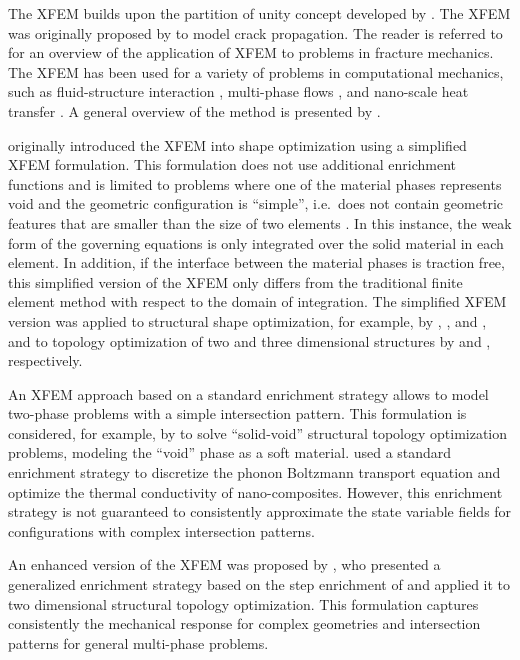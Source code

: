 The XFEM builds upon the partition of unity concept developed by \citet{NME:NME86}. The XFEM was originally proposed by \citet{BB:99} to model crack propagation. The reader is referred to \citet{ANH:09} for an overview of the application of XFEM to problems in fracture mechanics. The XFEM has been used for a variety of problems in computational mechanics, such as fluid-structure interaction \citep{GW:08,GW:08a}, multi-phase flows \citep{Fries:09}, and nano-scale heat transfer \citep{LYM:11}. A general overview of the method is presented by \citet{FB:10}.

\citet{DMJ+:06} originally introduced the XFEM into shape optimization using a simplified XFEM formulation. This formulation does not use additional enrichment functions and is limited to problems where one of the material phases represents void and the geometric configuration is ``simple'', i.e.~does not contain geometric features that are smaller than the size of two elements \citep{MM:13}. In this instance, the weak form of the governing equations is only integrated over the solid material in each element. In addition, if the interface between the material phases is traction free, this simplified version of the XFEM only differs from the traditional finite element method with respect to the domain of integration. The simplified XFEM version was applied to structural shape optimization, for example, by \citet{DMJ+:06}, \citet{MMF+:05}, and \citet{MD:07}, and to topology optimization of two and three dimensional structures by \citet{HMM:13} and \citet{LWW:12}, respectively.

An XFEM approach based on a standard enrichment strategy allows to model two-phase problems with a simple intersection pattern. This formulation is considered, for example, by \citet{WWX:10} to solve ``solid-void'' structural topology optimization problems, modeling the ``void'' phase as a soft material. \citet{MKM+:11} used a standard enrichment strategy to discretize the phonon Boltzmann transport equation and optimize the thermal conductivity of nano-composites. However, this enrichment strategy is not guaranteed to consistently approximate the state variable fields for configurations with complex intersection patterns.

An enhanced version of the XFEM was proposed by \citet{MM:13}, who presented a generalized enrichment strategy based on the step enrichment of \citet{HH:04} and applied it to two dimensional structural topology optimization. This formulation captures consistently the mechanical response for complex geometries and intersection patterns for general multi-phase problems.


